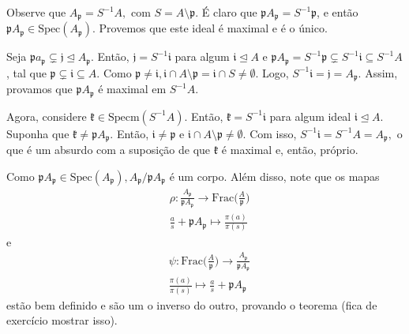 \documentclass[algebraII_notes.tex]{subfiles}
\begin{document}
\begin{proof*}
	Observe que \(A_{\mathfrak{p}}=S^{-1}A,\) com \(S=A\setminus{\mathfrak{p}}.\) É claro que \(\mathfrak{p}A_{\mathfrak{p}} = S^{-1}\mathfrak{p}\), e então
	\(\mathfrak{p}A_{\mathfrak{p}}\in \mathrm{Spec}(A_{\mathfrak{p}}).\) Provemos que este ideal é maximal e é o único.

	Seja \(\mathfrak{p}a_{\mathfrak{p}}\subsetneq \mathfrak{j}\trianglelefteq{A_{\mathfrak{p}}}. \) Então, \(\mathfrak{j} = S^{-1}\mathfrak{i}\) para algum \(\mathfrak{i}\trianglelefteq{A}\) e
	\(\mathfrak{p}A_{\mathfrak{p}} = S^{-1}\mathfrak{p}\subsetneq S^{-1}\mathfrak{i}\subseteq S^{-1}A \), tal que \(\mathfrak{p}\subsetneq \mathfrak{i}\subseteq A. \)
	Como \(\mathfrak{p}\neq \mathfrak{i}, \mathfrak{i}\cap A\setminus{\mathfrak{p}} = \mathfrak{i}\cap S \neq\emptyset\). Logo,
	\(S^{-1}\mathfrak{i} = \mathfrak{j} = A_{\mathfrak{p}}.\) Assim, provamos que \(\mathfrak{p}A_{\mathfrak{p}}\) é maximal em \(S^{-1}A.\)

	Agora, considere \(\mathfrak{k}\in \mathrm{Specm}(S^{-1}A)\). Então, \(\mathfrak{k} = S^{-1}\mathfrak{i}\) para algum ideal
	\(\mathfrak{i}\trianglelefteq{A}.\) Suponha que \(\mathfrak{k}\neq \mathfrak{p}A_{\mathfrak{p}}.\) Então, \(\mathfrak{i}\neq \mathfrak{p}\) e
	\(\mathfrak{i}\cap A\setminus{\mathfrak{p}}\neq\emptyset.\) Com isso, \(S^{-1}\mathfrak{i} = S^{-1}A = A_{\mathfrak{p}},\) o que é um absurdo com a
	suposição de que \(\mathfrak{k}\) é maximal e, então, próprio.

	Como \(\mathfrak{p}A_{\mathfrak{p}}\in \mathrm{Spec}(A_{\mathfrak{p}}), A_{\mathfrak{p}}/\mathfrak{p}A_{\mathfrak{p}}\) é um corpo. Além disso,
	note que os mapas
	\begin{align*}
		 & \rho :\frac{A_{\mathfrak{p}}}{\mathfrak{p}A_{\mathfrak{p}}}\rightarrow \mathrm{Frac}\biggl(\frac{A}{\mathfrak{p}}\biggr) \\
		 & \frac{a}{s} + \mathfrak{p}A_{\mathfrak{p}}\mapsto \frac{\pi (a)}{\pi (s)}
	\end{align*}
	e
	\begin{align*}
		 & \psi:\mathrm{Frac}\biggl(\frac{A}{\mathfrak{p}}\biggr)\rightarrow \frac{A_{\mathfrak{p}}}{\mathfrak{p}A_{\mathfrak{p}}} \\
		 & \frac{\pi (a)}{\pi (s)}\mapsto \frac{a}{s} + \mathfrak{p}A_{\mathfrak{p}}
	\end{align*}
	estão bem definido e são um o inverso do outro, provando o teorema (fica de exercício mostrar isso). \qedsymbol
\end{proof*}
\end{document}
